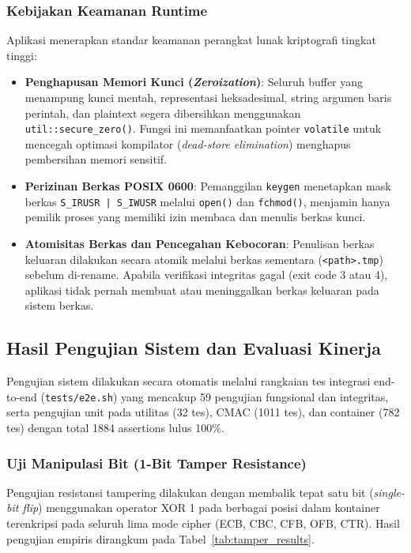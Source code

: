 \subsubsection{Kebijakan Keamanan Runtime}
Aplikasi menerapkan standar keamanan perangkat lunak kriptografi tingkat tinggi:
\begin{itemize}
    \item \textbf{Penghapusan Memori Kunci (\textit{Zeroization})}: Seluruh buffer yang menampung kunci mentah, representasi heksadesimal, string argumen baris perintah, dan plaintext segera dibersihkan menggunakan \texttt{util::secure\_zero()}. Fungsi ini memanfaatkan pointer \texttt{volatile} untuk mencegah optimasi kompilator (\textit{dead-store elimination}) menghapus pembersihan memori sensitif.
    \item \textbf{Perizinan Berkas POSIX 0600}: Pemanggilan \texttt{keygen} menetapkan mask berkas \texttt{S\_IRUSR | S\_IWUSR} melalui \texttt{open()} dan \texttt{fchmod()}, menjamin hanya pemilik proses yang memiliki izin membaca dan menulis berkas kunci.
    \item \textbf{Atomisitas Berkas dan Pencegahan Kebocoran}: Penulisan berkas keluaran dilakukan secara atomik melalui berkas sementara (\texttt{<path>.tmp}) sebelum di-rename. Apabila verifikasi integritas gagal (exit code 3 atau 4), aplikasi tidak pernah membuat atau meninggalkan berkas keluaran pada sistem berkas.
\end{itemize}

\subsection{Hasil Pengujian Sistem dan Evaluasi Kinerja}

Pengujian sistem dilakukan secara otomatis melalui rangkaian tes integrasi end-to-end (\texttt{tests/e2e.sh}) yang mencakup 59 pengujian fungsional dan integritas, serta pengujian unit pada utilitas (32 tes), CMAC (1011 tes), dan container (782 tes) dengan total 1884 assertions lulus 100\%.

\subsubsection{Uji Manipulasi Bit (1-Bit Tamper Resistance)}
Pengujian resistansi tampering dilakukan dengan membalik tepat satu bit (\textit{single-bit flip}) menggunakan operator XOR 1 pada berbagai posisi dalam kontainer terenkripsi pada seluruh lima mode cipher (ECB, CBC, CFB, OFB, CTR). Hasil pengujian empiris dirangkum pada Tabel~\ref{tab:tamper_results}.

